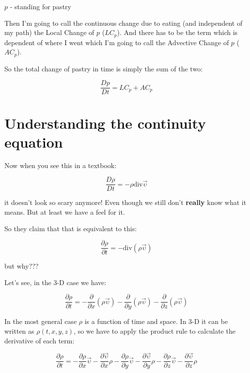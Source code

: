 \documentclass[12pt]{report}
\begin{document}
$p$ - standing for pastry

Then I'm going to call the continuous change due to eating (and independent of my path) the Local Change of $p$ ($LC_p$). And there has to be the term which is dependent of where I went which I'm going to call the Advective Change of $p$ ($AC_p$).

So the total change of pastry in time is simply the sum of the two:

\begin{equation}
\frac{Dp}{Dt} = LC_p + AC_p
\end{equation}






\section{Understanding the continuity equation}

Now when you see this in a textbook:

\begin{equation}
\frac{D \rho}{D t} = - \rho \text{div} \vec{\upsilon}
\end{equation}

it doesn't look so scary anymore! Even though we still don't \textbf{really} know what it means. But at least we have a feel for it.







So they claim that that is equivalent to this:

\begin{equation}
\frac{\partial \rho}{\partial t} = - \text{div} (\rho \vec{\upsilon})
\end{equation}

but why???

Let's see, in the 3-D case we have:

\begin{equation}
\frac{\partial \rho}{\partial t} = - \frac{\partial}{\partial x} (\rho \vec{\upsilon}) - \frac{\partial}{\partial y} (\rho \vec{\upsilon}) - \frac{\partial}{\partial z} (\rho \vec{\upsilon})
\end{equation}

In the most general case $\rho$ is a function of time and space. In 3-D it can be written as $\rho(t, x, y, z)$, so we have to apply the product rule to calculate the derivative of each term:

\begin{equation}
\frac{\partial \rho}{\partial t} = - \frac{\partial \rho}{\partial x} \vec{\upsilon} - \frac{\partial \vec{\upsilon}}{\partial x} \rho - \frac{\partial \rho}{\partial y} \vec{\upsilon} - \frac{\partial \vec{\upsilon}}{\partial y} \rho - \frac{\partial \rho}{\partial z} \vec{\upsilon} - \frac{\partial \vec{\upsilon}}{\partial z} \rho 
\end{equation}
\end{document}
